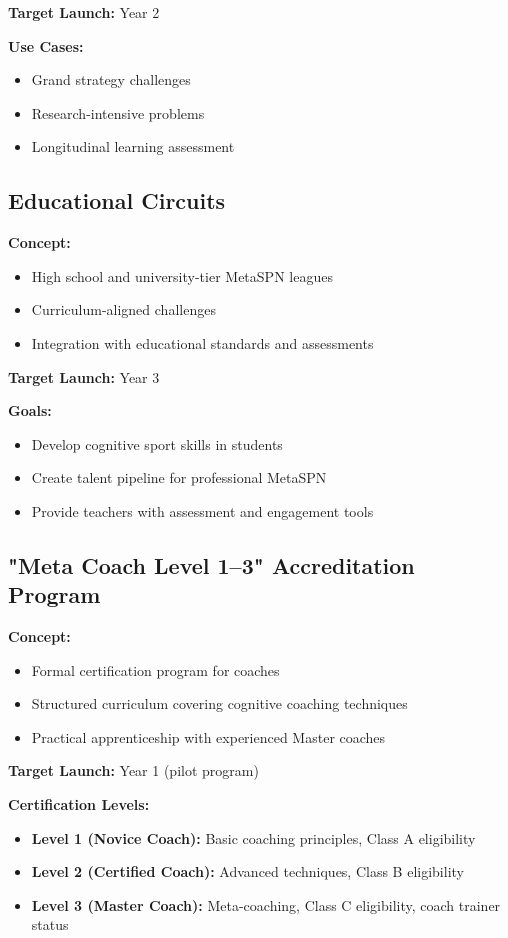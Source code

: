 \textbf{Target Launch:} Year 2

\textbf{Use Cases:}
\begin{itemize}[leftmargin=*]
  \item Grand strategy challenges
  \item Research-intensive problems
  \item Longitudinal learning assessment
\end{itemize}

\subsection{Educational Circuits}

\textbf{Concept:}
\begin{itemize}[leftmargin=*]
  \item High school and university-tier MetaSPN leagues
  \item Curriculum-aligned challenges
  \item Integration with educational standards and assessments
\end{itemize}

\textbf{Target Launch:} Year 3

\textbf{Goals:}
\begin{itemize}[leftmargin=*]
  \item Develop cognitive sport skills in students
  \item Create talent pipeline for professional MetaSPN
  \item Provide teachers with assessment and engagement tools
\end{itemize}

\subsection{"Meta Coach Level 1–3" Accreditation Program}

\textbf{Concept:}
\begin{itemize}[leftmargin=*]
  \item Formal certification program for coaches
  \item Structured curriculum covering cognitive coaching techniques
  \item Practical apprenticeship with experienced Master coaches
\end{itemize}

\textbf{Target Launch:} Year 1 (pilot program)

\textbf{Certification Levels:}
\begin{itemize}[leftmargin=*]
  \item \textbf{Level 1 (Novice Coach):} Basic coaching principles, Class A eligibility
  \item \textbf{Level 2 (Certified Coach):} Advanced techniques, Class B eligibility
  \item \textbf{Level 3 (Master Coach):} Meta-coaching, Class C eligibility, coach trainer status
\end{itemize}

